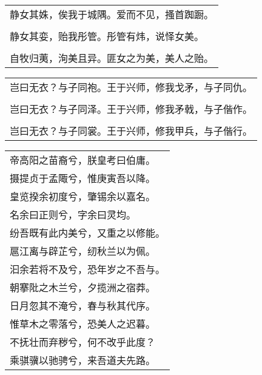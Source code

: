 \noindent\begin{minipage}{\linewidth}
  \vskip-3pt\begin{table}[H]
    \centering
    \begin{tabular}{@{}l@{}}
静女其姝，俟我于城隅。爱而不见，搔首踟蹰。\\
\\
静女其娈，贻我彤管。彤管有炜，说怿女美。\\
\\
自牧归荑，洵美且异。匪女之为美，美人之贻。
    \end{tabular}
  \end{table}
\end{minipage}
\vspace{1cm}


\noindent\begin{minipage}{\linewidth}
  \vskip-3pt\begin{table}[H]
    \centering
    \begin{tabular}{@{}l@{}}
岂曰无衣？与子同袍。王于兴师，修我戈矛，与子同仇。\\
\\
岂曰无衣？与子同泽。王于兴师，修我矛戟，与子偕作。\\
\\
岂曰无衣？与子同裳。王于兴师，修我甲兵，与子偕行。
    \end{tabular}
  \end{table}
\end{minipage}
\vspace{1cm}


\noindent\begin{minipage}{\linewidth}
  \vskip-3pt\begin{table}[H]
    \centering
    \begin{tabular}{@{}l@{}}
帝高阳之苗裔兮，朕皇考曰伯庸。\\
摄提贞于孟陬兮，惟庚寅吾以降。\\
皇览揆余初度兮，肇锡余以嘉名。\\
名余曰正则兮，字余曰灵均。\\
纷吾既有此内美兮，又重之以修能。\\
扈江离与辟芷兮，纫秋兰以为佩。\\
汩余若将不及兮，恐年岁之不吾与。\\
朝搴阰之木兰兮，夕揽洲之宿莽。\\
日月忽其不淹兮，春与秋其代序。\\
惟草木之零落兮，恐美人之迟暮。\\
不抚壮而弃秽兮，何不改乎此度？\\
乘骐骥以驰骋兮，来吾道夫先路。
    \end{tabular}
  \end{table}
\end{minipage}
\vspace{1cm}



